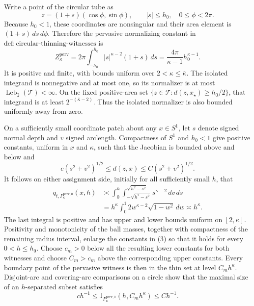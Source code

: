 Write a point of the circular tube as
\[
 z=(1+s)(\cos\phi,\sin\phi),\qquad |s|\le h_0,
 \quad 0\le\phi<2\pi.
\]
Because \(h_0<1\), these coordinates are nonsingular and their area
element is \((1+s)\,ds\,d\phi\).  Therefore the pervasive normalizing
constant in \(\mathrm{def:circular\text{-}thinning\text{-}witnesses}\) is
\[
 Z_{\kappa}^{\mathrm{perv}}
 =2\pi\int_{-h_0}^{h_0}|s|^{\kappa-2}(1+s)\,ds
 =\frac{4\pi}{\kappa-1}h_0^{\kappa-1}.
 \tag{1}
\]
It is positive and finite, with bounds uniform over
\(2<\kappa\le\overline\kappa\).  The isolated integrand is nonnegative
and at most one, so its normalizer is at most
\(\operatorname{Leb}_2(\mathcal T)<\infty\).  On the fixed positive-area
set
\(\{z\in\mathcal T:d(z,x_{\star})\ge h_0/2\}\), that integrand is at
least \(2^{-(\overline\kappa-2)}\).  Thus the isolated normalizer is also
bounded uniformly away from zero.

On a sufficiently small coordinate patch about any \(x\in S^1\), let
\(s\) denote signed normal depth and \(v\) signed arclength.  Compactness
of \(S^1\) and \(h_0<1\) give positive constants, uniform in \(x\) and
\(\kappa\), such that the Jacobian is bounded above and below and
\[
 c(s^2+v^2)^{1/2}\le d(z,x)\le C(s^2+v^2)^{1/2}.
 \tag{2}
\]
It follows on either assignment side, initially for all sufficiently
small \(h\), that
\[
 \begin{aligned}
 q_{t,P_{\kappa}^{\mathrm{perv},0}}(x,h)
 &\asymp
 \int_0^h\int_{-\sqrt{h^2-s^2}}^{\sqrt{h^2-s^2}}
 s^{\kappa-2}\,dv\,ds\\
 &=h^{\kappa}\int_0^1 2w^{\kappa-2}\sqrt{1-w^2}\,dw
 \asymp h^{\kappa}.
 \end{aligned}
 \tag{3}
\]
The last integral is positive and has upper and lower bounds uniform on
\([2,\overline\kappa]\).  Positivity and monotonicity of the ball masses,
together with compactness of the remaining radius interval, enlarge the
constants in (3) so that it holds for every \(0<h\le h_0\).  Choose
\(c_m>0\) below all the resulting lower constants for both witnesses and
choose \(C_m>c_m\) above the corresponding upper constants.  Every
boundary point of the pervasive witness is then in the thin set at level
\(C_mh^{\kappa}\).  Disjoint-arc and covering-arc comparisons on a circle
show that the maximal size of an \(h\)-separated subset satisfies
\[
 c h^{-1}\le \mathsf J_{P_{\kappa}^{\mathrm{perv},0}}
       (h,C_mh^{\kappa})\le C h^{-1}.
 \tag{4}
\]

